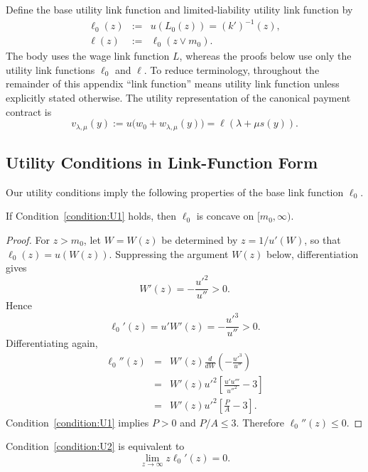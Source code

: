 Define the base utility link function and limited-liability utility link function by
\begin{eqnarray*}
    \ell_0(z)&:=&u(L_0(z))=(k')^{-1}(z),\\
    \ell(z)&:=&\ell_0(z\vee m_0).
\end{eqnarray*}
The body uses the wage link function $L$, whereas the proofs below use only the
utility link functions $\ell_0$ and $\ell$.  To reduce terminology, throughout
the remainder of this appendix ``link function'' means utility link function
unless explicitly stated otherwise.
The utility representation of the canonical payment contract is
\[
    v_{\lambda,\mu}(y)
    :=u\bigl(w_0+w_{\lambda,\mu}(y)\bigr)
    =\ell(\lambda+\mu s(y)).
\]

\subsection{Utility Conditions in Link-Function Form}
\label{subsec:appendix-link-conditions}

Our utility conditions imply the following properties of the base link function $\ell_0$.

\begin{remark}
\label{rem:link-concavity}
If Condition~\eqref{condition:U1} holds, then $\ell_0$ is concave on
$[m_0,\infty)$.
\end{remark}

\begin{proof}
For $z>m_0$, let $W=W(z)$ be determined by
$z=1/u'(W)$, so that $\ell_0(z)=u(W(z))$.  Suppressing the argument
$W(z)$ below, differentiation gives
\[
    W'(z)=-\frac{u'^2}{u''}>0.
\]
Hence
\[
    \ell_0'(z)=u'W'(z)
    =-\frac{u'^3}{u''}>0.
\]
Differentiating again,
\begin{eqnarray*}
    \ell_0''(z)
    &=&W'(z)\frac{d}{dW}
       \left(-\frac{u'^3}{u''}\right)\\
    &=&W'(z)u'^2
       \left[\frac{u'u'''}{u''^2}-3\right]\\
    &=&W'(z)u'^2
       \left[\frac{P}{A}-3\right].
\end{eqnarray*}
Condition~\eqref{condition:U1} implies $P>0$ and $P/A\leq3$.
Therefore $\ell_0''(z)\leq0$.
\end{proof}

\begin{remark}
\label{rem:link-flattening}
Condition~\eqref{condition:U2} is equivalent to
\[
    \lim_{z\to\infty}z\ell_0'(z)=0.
\]
\end{remark}

